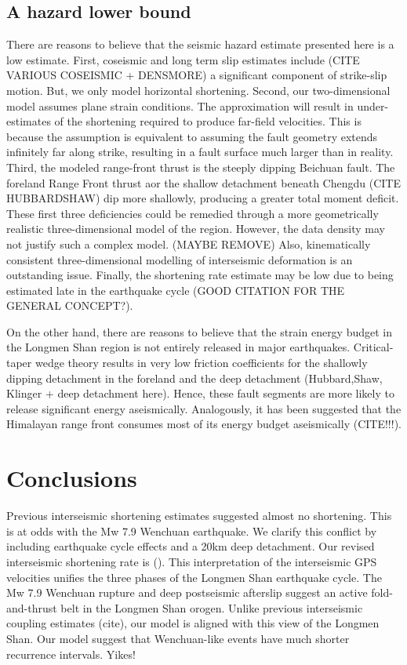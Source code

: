 \documentclass{article}
\begin{document}
\subsection{A hazard lower bound}
There are reasons to believe that the seismic hazard estimate presented here is a low estimate.
First, coseismic and long term slip estimates include (CITE VARIOUS COSEISMIC + DENSMORE) a significant component of strike-slip motion. But, we only model horizontal shortening. 
Second, our two-dimensional model assumes plane strain conditions. 
The approximation will result in under-estimates of the shortening required to produce far-field velocities.
This is because the assumption is equivalent to assuming the fault geometry extends infinitely far along strike, resulting in a fault surface much larger than in reality. 
Third, the modeled range-front thrust is the steeply dipping Beichuan fault. The foreland Range Front thrust aor the shallow detachment beneath Chengdu (CITE HUBBARDSHAW) dip more shallowly, producing a greater total moment deficit.
These first three deficiencies could be remedied through a more geometrically realistic three-dimensional model of the region. However, the data density may not justify such a complex model. 
(MAYBE REMOVE) Also, kinematically consistent three-dimensional modelling of interseismic deformation is an outstanding issue. 
Finally, the shortening rate estimate may be low due to being estimated late in the earthquake cycle (GOOD CITATION FOR THE GENERAL CONCEPT?). 

On the other hand, there are reasons to believe that the strain energy budget in the Longmen Shan region is not entirely released in major earthquakes. Critical-taper wedge theory results in very low friction coefficients for the shallowly dipping detachment in the foreland and the deep detachment (Hubbard,Shaw, Klinger + deep detachment here). Hence, these fault segments are more likely to release significant energy aseismically. Analogously, it has been suggested that the Himalayan range front consumes most of its energy budget aseismically (CITE!!!).

\section{Conclusions}
Previous interseismic shortening estimates suggested almost no shortening. This is at odds with the Mw 7.9 Wenchuan earthquake. We clarify this conflict by including earthquake cycle effects and a 20km deep detachment. Our revised interseismic shortening rate is ().
This interpretation of the interseismic GPS velocities unifies the three phases of the Longmen Shan earthquake cycle. The Mw 7.9 Wenchuan rupture and deep postseismic afterslip suggest an active fold-and-thrust belt in the Longmen Shan orogen. Unlike previous interseismic coupling estimates (cite), our model is aligned with this view of the Longmen Shan. 
Our model suggest that Wenchuan-like events have much shorter recurrence intervals. Yikes!
\end{document}
